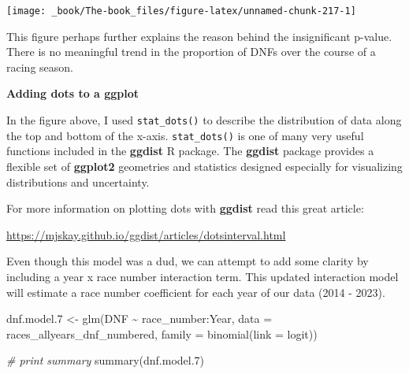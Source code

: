 \documentclass[
]{book}
\newenvironment{Shaded}{\begin{snugshade}}{\end{snugshade}}
\newcommand{\AttributeTok}[1]{\textcolor[rgb]{0.77,0.63,0.00}{#1}}
\newcommand{\CommentTok}[1]{\textcolor[rgb]{0.56,0.35,0.01}{\textit{#1}}}
\newcommand{\FloatTok}[1]{\textcolor[rgb]{0.00,0.00,0.81}{#1}}
\newcommand{\FunctionTok}[1]{\textcolor[rgb]{0.00,0.00,0.00}{#1}}
\newcommand{\NormalTok}[1]{#1}
\newcommand{\OtherTok}[1]{\textcolor[rgb]{0.56,0.35,0.01}{#1}}
\newcommand{\SpecialCharTok}[1]{\textcolor[rgb]{0.00,0.00,0.00}{#1}}
\newcommand{\StringTok}[1]{\textcolor[rgb]{0.31,0.60,0.02}{#1}}
\begin{document}
\begin{center}\texttt{[image: \_book/The-book\_files/figure-latex/unnamed-chunk-217-1]} \end{center}

This figure perhaps further explains the reason behind the insignificant p-value. There is no meaningful trend in the proportion of DNFs over the course of a racing season.

\begin{blackbox}

\begin{center}
\textbf{Adding dots to a ggplot}

\end{center}

In the figure above, I used \texttt{stat\_dots()} to describe the distribution of data along the top and bottom of the x-axis. \texttt{stat\_dots()} is one of many very useful functions included in the \textbf{ggdist} R package. The \textbf{ggdist} package provides a flexible set of \textbf{ggplot2} geometries and statistics designed especially for visualizing distributions and uncertainty.

For more information on plotting dots with \textbf{ggdist} read this great article:

\url{https://mjskay.github.io/ggdist/articles/dotsinterval.html}

\end{blackbox}

Even though this model was a dud, we can attempt to add some clarity by including a year x race number interaction term. This updated interaction model will estimate a race number coefficient for each year of our data (2014 - 2023).

\begin{Shaded}
\begin{Highlighting}[]
\NormalTok{dnf.model}\FloatTok{.7} \OtherTok{\textless{}{-}} \FunctionTok{glm}\NormalTok{(DNF }\SpecialCharTok{\textasciitilde{}}\NormalTok{ race\_number}\SpecialCharTok{:}\NormalTok{Year, }\AttributeTok{data =}\NormalTok{ races\_allyears\_dnf\_numbered,}
                   \AttributeTok{family =} \FunctionTok{binomial}\NormalTok{(}\AttributeTok{link =} \StringTok{\textquotesingle{}logit\textquotesingle{}}\NormalTok{))}

\CommentTok{\# print summary}
\FunctionTok{summary}\NormalTok{(dnf.model}\FloatTok{.7}\NormalTok{)}
\end{Highlighting}
\end{Shaded}
\end{document}
